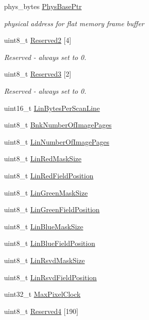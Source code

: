\begin{DoxyCompactItemize}
\item 
phys\+\_\+bytes \hyperlink{struct____attribute_____a852a4f68cfbabf08df197128e137bde6}{Phys\+Base\+Ptr}
\begin{DoxyCompactList}\small\item\em physical address for flat memory frame buffer \end{DoxyCompactList}\item 
uint8\+\_\+t \hyperlink{struct____attribute_____a534ebf7a2bdad17747cfc9cb6cc50c5c}{Reserved2} \mbox{[}4\mbox{]}
\begin{DoxyCompactList}\small\item\em Reserved -\/ always set to 0. \end{DoxyCompactList}\item 
uint8\+\_\+t \hyperlink{struct____attribute_____a9336499af9094522dbe1bfd4d43934a1}{Reserved3} \mbox{[}2\mbox{]}
\begin{DoxyCompactList}\small\item\em Reserved -\/ always set to 0. \end{DoxyCompactList}\item 
uint16\+\_\+t \hyperlink{struct____attribute_____af7036270c257deabc1ebd111faf3e3a5}{Lin\+Bytes\+Per\+Scan\+Line}
\item 
uint8\+\_\+t \hyperlink{struct____attribute_____ad5820084f2b821b85a635df8394f0d9e}{Bnk\+Number\+Of\+Image\+Pages}
\item 
uint8\+\_\+t \hyperlink{struct____attribute_____af9ba0d9902f5336bd9d044a9dee2ba42}{Lin\+Number\+Of\+Image\+Pages}
\item 
uint8\+\_\+t \hyperlink{struct____attribute_____a88a5ced225c9ef7ed6ffe33e5a39edc6}{Lin\+Red\+Mask\+Size}
\item 
uint8\+\_\+t \hyperlink{struct____attribute_____aec8d45f188ac9210b88216af83de847d}{Lin\+Red\+Field\+Position}
\item 
uint8\+\_\+t \hyperlink{struct____attribute_____a5768a84391f8a26d8a9bfd6a22d5e49d}{Lin\+Green\+Mask\+Size}
\item 
uint8\+\_\+t \hyperlink{struct____attribute_____a5571b1959950d520f2b45bb5549994e3}{Lin\+Green\+Field\+Position}
\item 
uint8\+\_\+t \hyperlink{struct____attribute_____aa2b79b8eed8d842e0db481fb1fbb9a06}{Lin\+Blue\+Mask\+Size}
\item 
uint8\+\_\+t \hyperlink{struct____attribute_____a99e6b6bdbda9f98f2823429dfd5b5685}{Lin\+Blue\+Field\+Position}
\item 
uint8\+\_\+t \hyperlink{struct____attribute_____a577b5892a22d06e230f528a62a472d1d}{Lin\+Rsvd\+Mask\+Size}
\item 
uint8\+\_\+t \hyperlink{struct____attribute_____a012126db503ad1281ae53aa41f4c96a7}{Lin\+Rsvd\+Field\+Position}
\item 
uint32\+\_\+t \hyperlink{struct____attribute_____afd81a69353c35e8b1fb9b696931f79a5}{Max\+Pixel\+Clock}
\item 
uint8\+\_\+t \hyperlink{struct____attribute_____ab859fb715f83f005dfa2f13d8b0e4ff0}{Reserved4} \mbox{[}190\mbox{]}
\end{DoxyCompactItemize}


